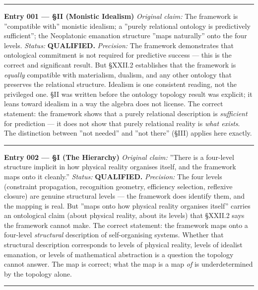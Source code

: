 \documentclass[12pt,a4paper]{article}
\begin{document}
\begin{center}
\rule{0.5\textwidth}{0.4pt}
\end{center}

\textbf{Entry 001 --- §II (Monistic Idealism)}
\emph{Original claim:} The framework is ''compatible with'' monistic idealism; a ''purely relational ontology is predictively sufficient''; the Neoplatonic emanation structure ''maps naturally'' onto the four levels.
\emph{Status:} \textbf{QUALIFIED.}
\emph{Precision:} The framework demonstrates that ontological commitment is not required for predictive success --- this is the correct and significant result. But §XXII.2 establishes that the framework is \emph{equally} compatible with materialism, dualism, and any other ontology that preserves the relational structure. Idealism is one consistent reading, not the privileged one. §II was written before the ontology \perp topology result was explicit; it leans toward idealism in a way the algebra does not license. The correct statement: the framework shows that a purely relational description is \emph{sufficient} for prediction --- it does not show that purely relational reality is \emph{what exists}. The distinction between ''not needed'' and ''not there'' (§III) applies here exactly.

\begin{center}
\rule{0.5\textwidth}{0.4pt}
\end{center}

\textbf{Entry 002 --- §I (The Hierarchy)}
\emph{Original claim:} ''There is a four-level structure implicit in how physical reality organises itself, and the framework maps onto it cleanly.''
\emph{Status:} \textbf{QUALIFIED.}
\emph{Precision:} The four levels (constraint propagation, recognition geometry, efficiency selection, reflexive closure) are genuine structural levels --- the framework does identify them, and the mapping is real. But ''maps onto how physical reality organises itself'' carries an ontological claim (about physical reality, about its levels) that §XXII.2 says the framework cannot make. The correct statement: the framework maps onto a four-level \emph{structural} description of self-organising systems. Whether that structural description corresponds to levels of physical reality, levels of idealist emanation, or levels of mathematical abstraction is a question the topology cannot answer. The map is correct; what the map is a map \emph{of} is underdetermined by the topology alone.

\begin{center}
\rule{0.5\textwidth}{0.4pt}
\end{center}
\end{document}
